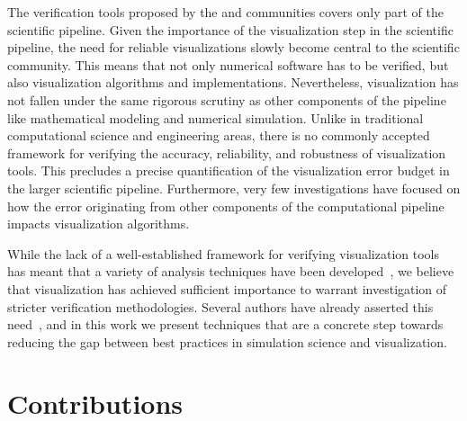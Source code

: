 The verification tools proposed by the \cs{} and \cse{} communities covers
only part of the scientific pipeline. Given the importance of the visualization step
in the scientific pipeline,  the need for reliable visualizations slowly become central to the scientific community. This means that not only numerical software has to be verified, but also visualization algorithms and implementations.
%
Nevertheless, visualization has not fallen under the same
rigorous scrutiny as other components of the pipeline
like mathematical modeling and numerical simulation.
Unlike in traditional computational science and engineering areas,
there is no commonly accepted framework for verifying the accuracy, reliability, 
and robustness of visualization tools. This precludes
a precise quantification of the visualization error budget in the 
larger scientific pipeline.
Furthermore, very few investigations have focused on how the error originating from 
other components of the computational pipeline
impacts visualization algorithms. 

While the lack of a well-established framework for verifying visualization
tools has meant that a variety of analysis techniques have been
developed~\cite{zhou01,Tory:2004:HFV:951847.951892}, we believe that visualization 
has achieved sufficient importance to warrant investigation of
stricter verification methodologies. Several authors have
already asserted this need~\cite{Globus:1994:FWS:182452.182465, globus95,kirby-vv-08}, and in this work we present techniques that are a concrete step towards reducing the gap between best practices in simulation science and visualization.

\section{Contributions}

